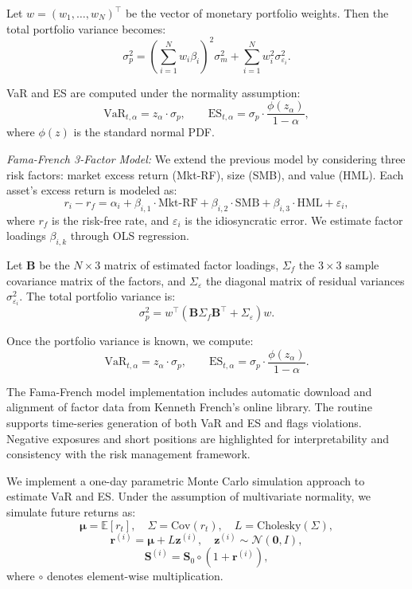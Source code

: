 \documentclass[12pt]{article}
\begin{document}
Let $w = (w_1, \dots, w_N)^\top$ be the vector of monetary portfolio weights. Then the total portfolio variance becomes:
\[
\sigma_p^2 = \left(\sum_{i=1}^N w_i \beta_i\right)^2 \sigma_m^2 + \sum_{i=1}^N w_i^2 \sigma_{\varepsilon_i}^2.
\]

VaR and ES are computed under the normality assumption:
\[
\text{VaR}_{t,\alpha} = z_\alpha \cdot \sigma_p, \qquad
\text{ES}_{t,\alpha} = \sigma_p \cdot \frac{\phi(z_\alpha)}{1 - \alpha},
\]
where $\phi(z)$ is the standard normal PDF.

\textit{Fama-French 3-Factor Model:}  
We extend the previous model by considering three risk factors: market excess return (Mkt-RF), size (SMB), and value (HML). Each asset’s excess return is modeled as:
\[
r_i - r_f = \alpha_i + \beta_{i,1} \cdot \text{Mkt-RF} + \beta_{i,2} \cdot \text{SMB} + \beta_{i,3} \cdot \text{HML} + \varepsilon_i,
\]
where $r_f$ is the risk-free rate, and $\varepsilon_i$ is the idiosyncratic error. We estimate factor loadings $\beta_{i,k}$ through OLS regression.

Let $\mathbf{B}$ be the $N \times 3$ matrix of estimated factor loadings, $\Sigma_f$ the $3 \times 3$ sample covariance matrix of the factors, and $\Sigma_\varepsilon$ the diagonal matrix of residual variances $\sigma_{\varepsilon_i}^2$. The total portfolio variance is:
\[
\sigma_p^2 = w^\top (\mathbf{B} \Sigma_f \mathbf{B}^\top + \Sigma_\varepsilon) w.
\]

Once the portfolio variance is known, we compute:
\[
\text{VaR}_{t,\alpha} = z_\alpha \cdot \sigma_p, \qquad
\text{ES}_{t,\alpha} = \sigma_p \cdot \frac{\phi(z_\alpha)}{1 - \alpha}.
\]

The Fama-French model implementation includes automatic download and alignment of factor data from Kenneth French’s online library. The routine supports time-series generation of both VaR and ES and flags violations. Negative exposures and short positions are highlighted for interpretability and consistency with the risk management framework.

\vspace{0.6em}

\vspace{1em}
\underline{}

\vspace{0.6em}
\underline{}

\vspace{0.6em}
We implement a one-day parametric Monte Carlo simulation approach to estimate VaR and ES. Under the assumption of multivariate normality, we simulate future returns as:
\[
\boldsymbol{\mu} = \mathbb{E}[r_t], \quad \Sigma = \text{Cov}(r_t), \quad L = \text{Cholesky}(\Sigma),
\]
\[
\mathbf{r}^{(i)} = \boldsymbol{\mu} + L \mathbf{z}^{(i)}, \quad \mathbf{z}^{(i)} \sim \mathcal{N}(\mathbf{0}, I),
\]
\[
\mathbf{S}^{(i)} = \mathbf{S}_0 \circ (1 + \mathbf{r}^{(i)}),
\]
where $\circ$ denotes element-wise multiplication.
\end{document}
